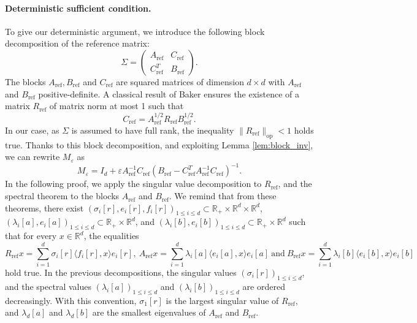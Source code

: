 \documentclass[]{article}
\DeclareMathOperator{\op}{op}
\DeclareMathOperator{\refe}{ref}
\numberwithin{equation}{section}
\theoremstyle{plain}
\begin{document}
\paragraph{Deterministic sufficient condition.} To give our deterministic argument, we introduce the following block decomposition of the reference matrix:
\begin{equation}\label{eq:ref_cov_blocks}
	\Sigma = \begin{pmatrix}
		A_{\refe} & C_{\refe} \\
		C_{\refe}^T & B_{\refe}
	\end{pmatrix}.
\end{equation}
The blocks $A_{\refe}, B_{\refe}$ and $C_{\refe}$ are squared matrices of dimension $d \times d$ with $A_{\refe}$ and $ B_{\refe}$ positive-definite. A classical result of Baker \cite[Thm.1.A]{baker1973joint} ensures the existence of a matrix $R_{\refe}$ of matrix norm at most 1 such that 
\begin{equation}\label{eq:ref_cov_correlation}
C_{\refe} = A_{\refe}^{1/2} R_{\refe} B_{\refe}^{1/2}.
\end{equation}
In our case, as $\Sigma$ is assumed to have full rank, the inequality $\|R_{\refe}\|_{\op} < 1$ holds true. Thanks to this block decomposition, and exploiting Lemma \ref{lem:block_inv}, we can rewrite $M_{\varepsilon}$ as
\begin{equation}\label{eq:block_inv_cov}
		M_\varepsilon = I_d + \varepsilon A^{-1}_{\refe}C_{\refe}(B_{\refe} - C_{\refe}^TA_{\refe}^{-1}C_{\refe})^{-1}.
\end{equation}
In the following proof, we apply the singular value decomposition to $R_{\refe}$, and the spectral theorem to the blocks $A_{\refe}$ and $B_{\refe}$. We remind that from these theorems, there exist $(\sigma_i[r], e_i[r], f_i[r])_{1 \leq i \leq d} \subset \mathbb{R}_+ \times \mathbb{R}^d \times \mathbb{R}^d$, $(\lambda_i[a], e_i[a])_{1 \leq i \leq d}  \subset \mathbb{R}_+ \times \mathbb{R}^d $, and $(\lambda_i[b], e_i[b])_{1 \leq i \leq d}  \subset \mathbb{R}_+ \times \mathbb{R}^d $ such that for every $x \in \mathbb{R}^d$, the equalities
\begin{equation}\label{eq:decompo_blocks_ref}
	R_{\refe} x = \sum_{i=1}^d \sigma_i[r] \langle f_i[r],x \rangle e_i[r], ~ 	A_{\refe} x = \sum_{i=1}^d \lambda_i[a] \langle e_i[a],x \rangle e_i[a] ~ \text{and} ~ B_{\refe} x = \sum_{i=1}^d \lambda_i[b] \langle e_i[b],x \rangle e_i[b]
\end{equation}
hold true. In the previous decompositions, the singular values $(\sigma_i[r])_{1 \leq i \leq d}$, and the spectral values $(\lambda_i[a])_{1 \leq i \leq d}$ and $(\lambda_i[b])_{1 \leq i \leq d}$ are ordered decreasingly. With this convention, $\sigma_1[r]$ is the largest singular value of $R_{\refe}$, and $\lambda_d[a]$ and $ \lambda_d[b]$ are the smallest eigenvalues of $A_{\refe}$ and $B_{\refe}$.
\end{document}
